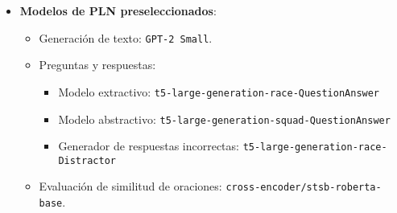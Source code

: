 \begin{itemize}
  \item \textbf{Modelos de PLN preseleccionados}:  
    \begin{itemize}
      \item Generación de texto: \texttt{GPT-2 Small}.  
      \item Preguntas y respuestas:  
        \begin{itemize}
          \item Modelo extractivo: \texttt{t5-large-generation-race-QuestionAnswer}
          \item Modelo abstractivo: \texttt{t5-large-generation-squad-QuestionAnswer}
          \item Generador de respuestas incorrectas: \texttt{t5-large-generation-race-Distractor}
        \end{itemize}
      \item Evaluación de similitud de oraciones: \texttt{cross-encoder/stsb-roberta-base}.
    \end{itemize}
\end{itemize}
